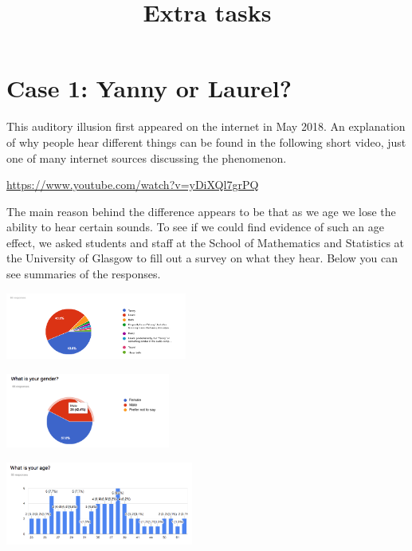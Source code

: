 \documentclass[
  letterpaper,
  DIV=11,
  numbers=noendperiod]{scrartcl}
\title{Extra tasks}
\author{}
\date{}
\makeatletter
\renewcommand{\maketitle}{\bgroup\setlength{\parindent}{0pt}
\begin{flushleft}
  {\color{uniblue}\sffamily\huge\textbf{\@title}} \vspace{0.3cm} \newline
  {\Large {\@subtitle}} \newline
  \@author
\end{flushleft}\egroup
}
\makeatother
\begin{document}
\maketitle

\pagestyle{mystyle}

\section{Case 1: Yanny or Laurel?}\label{case-1-yanny-or-laurel}

This auditory illusion first appeared on the internet in May 2018. An
explanation of why people hear different things can be found in the
following short video, just one of many internet sources discussing the
phenomenon.

\url{https://www.youtube.com/watch?v=yDiXQl7grPQ}

The main reason behind the difference appears to be that as we age we
lose the ability to hear certain sounds. To see if we could find
evidence of such an age effect, we asked students and staff at the
School of Mathematics and Statistics at the University of Glasgow to
fill out a survey on what they hear. Below you can see summaries of the
responses.

\begin{center}
\includegraphics[width=2.34in,height=\textheight]{images/07_yl1.png}
\end{center}

\begin{center}
\includegraphics[width=2.12in,height=\textheight]{images/07_yl2.png}
\end{center}

\begin{center}
\includegraphics[width=2.43in,height=\textheight]{images/07_yl3.png}
\end{center}
\end{document}
